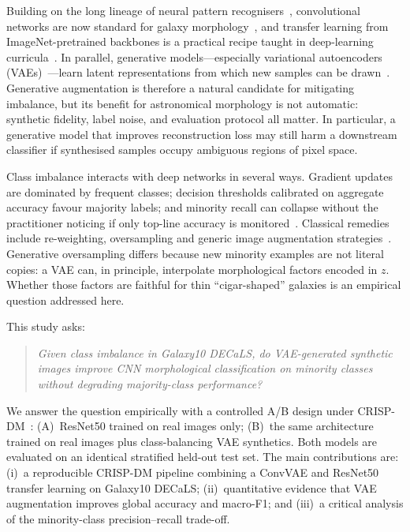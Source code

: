 \documentclass[conference]{IEEEtran}
\begin{document}
Building on the long lineage of neural pattern recognisers~\cite{rosenblatt1958,goodfellow2016dl}, convolutional networks are now standard for galaxy morphology~\cite{dieleman2015rotation}, and transfer learning from ImageNet-pretrained backbones is a practical recipe taught in deep-learning curricula~\cite{he2016deep,hope2017tensorflow}. In parallel, generative models---especially variational autoencoders (VAEs)~\cite{kingma2014auto}---learn latent representations from which new samples can be drawn~\cite{zhang2023dive,aggarwal2018neural}. Generative augmentation is therefore a natural candidate for mitigating imbalance, but its benefit for astronomical morphology is not automatic: synthetic fidelity, label noise, and evaluation protocol all matter. In particular, a generative model that improves reconstruction loss may still harm a downstream classifier if synthesised samples occupy ambiguous regions of pixel space.

Class imbalance interacts with deep networks in several ways. Gradient updates are dominated by frequent classes; decision thresholds calibrated on aggregate accuracy favour majority labels; and minority recall can collapse without the practitioner noticing if only top-line accuracy is monitored~\cite{aggarwal2018neural}. Classical remedies include re-weighting, oversampling and generic image augmentation strategies~\cite{shorten2019survey}. Generative oversampling differs because new minority examples are not literal copies: a VAE can, in principle, interpolate morphological factors encoded in $z$. Whether those factors are faithful for thin ``cigar-shaped'' galaxies is an empirical question addressed here.

This study asks:

\begin{quote}
\emph{Given class imbalance in Galaxy10 DECaLS, do VAE-generated synthetic images improve CNN morphological classification on minority classes without degrading majority-class performance?}
\end{quote}

We answer the question empirically with a controlled A/B design under CRISP-DM~\cite{chapman2000crisp}: (A)~ResNet50 trained on real images only; (B)~the same architecture trained on real images plus class-balancing VAE synthetics. Both models are evaluated on an identical stratified held-out test set. The main contributions are: (i)~a reproducible CRISP-DM pipeline combining a ConvVAE and ResNet50 transfer learning on Galaxy10 DECaLS; (ii)~quantitative evidence that VAE augmentation improves global accuracy and macro-F1; and (iii)~a critical analysis of the minority-class precision--recall trade-off.
\end{document}
